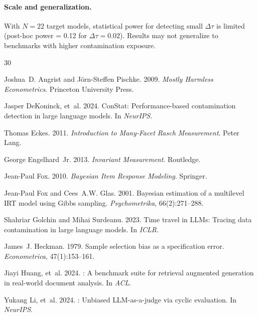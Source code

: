 \documentclass[11pt]{article}
\begin{document}
\paragraph{Scale and generalization.}
With $N = 22$ target models, statistical power for detecting small $\Delta\tau$ is limited (post-hoc power = 0.12 for $\Delta\tau = 0.02$).
Results may not generalize to benchmarks with higher contamination exposure.

\begin{thebibliography}{30}

Joshua~D. Angrist and J{\"o}rn-Steffen Pischke. 2009.
\newblock \emph{Mostly Harmless Econometrics}.
\newblock Princeton University Press.

Jasper DeKoninck, et~al. 2024.
\newblock ConStat: Performance-based contamination detection in large language models.
\newblock In \emph{NeurIPS}.

Thomas Eckes. 2011.
\newblock \emph{Introduction to Many-Facet Rasch Measurement}.
\newblock Peter Lang.

George Engelhard~Jr. 2013.
\newblock \emph{Invariant Measurement}.
\newblock Routledge.

Jean-Paul Fox. 2010.
\newblock \emph{Bayesian Item Response Modeling}.
\newblock Springer.

Jean-Paul Fox and Cees~A.W. Glas. 2001.
\newblock Bayesian estimation of a multilevel {IRT} model using {Gibbs} sampling.
\newblock \emph{Psychometrika}, 66(2):271--288.

Shahriar Golchin and Mihai Surdeanu. 2023.
\newblock Time travel in {LLMs}: Tracing data contamination in large language models.
\newblock In \emph{ICLR}.

James~J. Heckman. 1979.
\newblock Sample selection bias as a specification error.
\newblock \emph{Econometrica}, 47(1):153--161.

Jiayi Huang, et~al. 2024.
: A benchmark suite for retrieval augmented generation in real-world document analysis.
\newblock In \emph{ACL}.

Yukang Li, et~al. 2024.
: Unbiased {LLM}-as-a-judge via cyclic evaluation.
\newblock In \emph{NeurIPS}.


\end{thebibliography}
\end{document}
